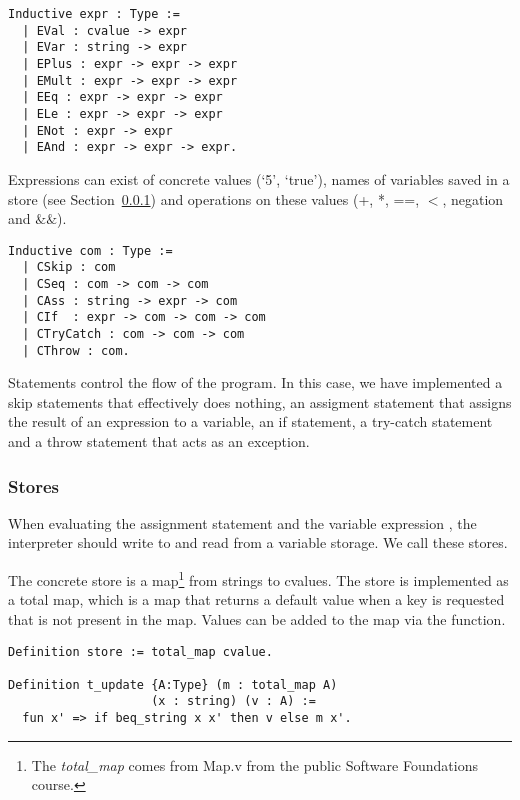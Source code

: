 \begin{verbatim}
Inductive expr : Type :=
  | EVal : cvalue -> expr
  | EVar : string -> expr
  | EPlus : expr -> expr -> expr
  | EMult : expr -> expr -> expr
  | EEq : expr -> expr -> expr
  | ELe : expr -> expr -> expr
  | ENot : expr -> expr
  | EAnd : expr -> expr -> expr.
\end{verbatim}

Expressions can exist of concrete values (`5', `true'), names of variables
saved in a store (see Section~\ref{sec:stores}) and operations on these values
(+, *, ==, $<$, negation and $\&\&$). 

\begin{verbatim}
Inductive com : Type :=
  | CSkip : com
  | CSeq : com -> com -> com
  | CAss : string -> expr -> com
  | CIf  : expr -> com -> com -> com
  | CTryCatch : com -> com -> com
  | CThrow : com. 
\end{verbatim}

Statements control the flow of the program. In this case, we have implemented a
skip statements that effectively does nothing, an assigment statement that
assigns the result of an expression to a variable, an if statement, a try-catch
statement and a throw statement that acts as an exception.

\subsubsection{Stores}\label{sec:stores}
When evaluating the assignment statement  and the variable
expression , the interpreter should write to and read from a variable
storage. We call these stores. 

The concrete store is a map\footnote{The \textit{total\_map} comes from 
	Map.v from the public Software Foundations course.} 
from strings to cvalues. The store is implemented as a total map, which is a
map that returns a default value when a key is requested that is not present in
the map. Values can be added to the map via the  function.

\begin{verbatim}
Definition store := total_map cvalue.

Definition t_update {A:Type} (m : total_map A)
                    (x : string) (v : A) :=
  fun x' => if beq_string x x' then v else m x'.

\end{verbatim}

